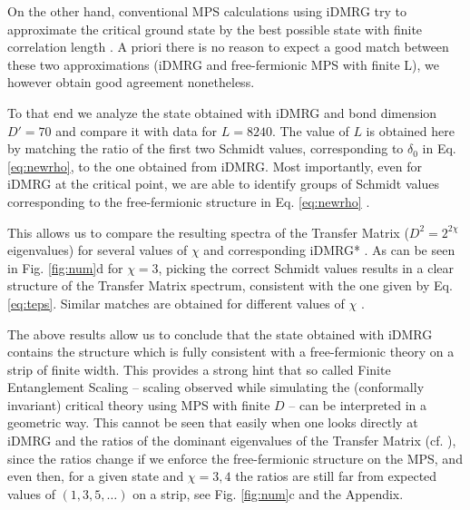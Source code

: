 \documentclass[prl,twocolumn,showpacs,floatfix,superscriptaddress,nofootinbib]{revtex4-1}
\begin{document}
On the other hand, conventional MPS calculations using iDMRG \cite{DMRG,McCulloch2008} try to approximate the critical ground state by the best possible state with finite correlation length \cite{Vid2014,Tagliacozzo2008,Pollmann2009,Pirvu2012}. 
A priori there is no reason to expect a good match between these two approximations (iDMRG and free-fermionic MPS with finite L), we however obtain good agreement nonetheless. 

To that end  we analyze the state obtained with iDMRG and bond dimension  $D'=70$ and compare it with data for $L=8240$. 
The value of $L$ is obtained here by matching the ratio of the first two Schmidt values, corresponding to $\delta_0$ in Eq. \eqref{eq:newrho}, to the one obtained from iDMRG.  
Most importantly, even for iDMRG at the critical point, we are able to identify groups of Schmidt values corresponding to the free-fermionic structure in Eq. \eqref{eq:newrho} \cite{iDMRG*}. 

This allows us to compare the resulting spectra of the Transfer Matrix  ($D^2=2^{2\chi}$ eigenvalues) for several values of $\chi$ and corresponding iDMRG* \cite{iDMRG*}. 
As can be seen in Fig. \ref{fig:num}d for $\chi=3$, picking the correct Schmidt values results in a clear structure of the Transfer Matrix spectrum, consistent with the one given by Eq. \eqref{eq:teps}. 
Similar matches are obtained for different values of $\chi$ \cite{Appendix}.
 
The above results allow us to conclude that the state obtained with iDMRG contains the structure which is fully consistent with a free-fermionic theory on a strip of finite width. 
This provides a strong hint that so called Finite Entanglement Scaling \cite{Vid2014,Tagliacozzo2008,Pollmann2009,Pirvu2012} -- scaling observed while simulating the (conformally invariant) critical theory using MPS with finite $D$ -- can be interpreted in a geometric way. 
This cannot be seen that easily when one looks directly at iDMRG and the ratios of the dominant eigenvalues of the Transfer Matrix (cf. \cite{Vid2014}), since the ratios change if we enforce the free-fermionic structure on the MPS, and even then, for a given state and $\chi =3,4$ the ratios are still far from expected values of $(1,3,5,\dotsc)$ on a strip, see Fig. \ref{fig:num}c and the Appendix. 
\end{document}
